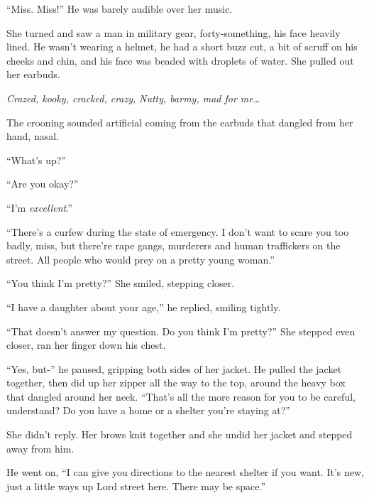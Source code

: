``Miss.  Miss!''  He was barely audible over her music.



She turned and saw a man in military gear, forty-something, his face heavily lined.  He wasn't wearing a helmet, he had a short buzz cut, a bit of scruff on his cheeks and chin, and his face was beaded with droplets of water.  She pulled out her earbuds.



\emph{Crazed, kooky, cracked, crazy, }\emph{Nutty, barmy, mad for me\ldots}



The crooning sounded artificial coming from the earbuds that dangled from her hand, nasal.



``What's up?''



``Are you okay?''



``I'm \emph{excellent}.''



``There's a curfew during the state of emergency.  I don't want to scare you too badly, miss, but there're rape gangs, murderers and human traffickers on the street.  All people who would prey on a pretty young woman.''



``You think I'm pretty?'' She smiled, stepping closer.



``I have a daughter about your age,'' he replied, smiling tightly.



``That doesn't answer my question.  Do you think I'm pretty?''  She stepped even closer, ran her finger down his chest.



``Yes, but-'' he paused, gripping both sides of her jacket.  He pulled the jacket together, then did up her zipper all the way to the top, around the heavy box that dangled around her neck.  ``That's all the more reason for you to be careful, understand?  Do you have a home or a shelter you're staying at?''



She didn't reply.  Her brows knit together and she undid her jacket and stepped away from him.



He went on, ``I can give you directions to the nearest shelter if you want. It's new, just a little ways up Lord street here.  There may be space.''



